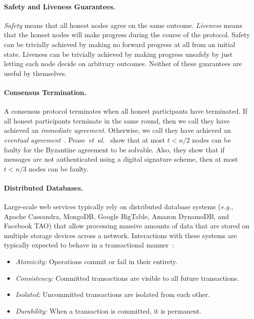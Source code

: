 \documentclass[11pt]{article}
\newcommand{\etal}{\textit{et~al.}}
\newcommand{\eg}{\textit{e.g.}}
\theoremstyle{mytheoremstyle}
\begin{document}
\paragraph{Safety and Liveness Guarantees.} \emph{Safety} means that all honest nodes agree on the same outcome. \emph{Liveness} means that the honest nodes will make progress during the course of the protocol. Safety can be trivially achieved by making no forward progress at all from an initial state. Liveness can be trivially achieved by making progress unsafely by just letting each node decide on arbitrary outcomes. Neither of these guarantees are useful by themselves.

\paragraph{Consensus Termination.} A consensus protocol terminates when all honest participants have terminated. If all honest participants terminate in the same round, then we call they have achieved an \emph{immediate agreement}. Otherwise, we call they have achieved an \emph{eventual agreement}~\cite{fischer}.
Pease~\etal~\cite{pease1980reaching} show that at most ${t<n/2}$ nodes can be faulty for the Byzantine agreement to be solvable. Also, they show that if messages are not authenticated using a digital signature scheme, then at most ${t<n/3}$ nodes can be faulty.

\paragraph{Distributed Databases.} Large-scale web services typically rely on distributed database systems (\eg, Apache Cassandra, MongoDB, Google BigTable, Amazon DynamoDB, and Facebook TAO) that allow processing massive amounts of data that are stored on multiple storage devices across a network. Interactions with these systems are typically expected to behave in a transactional manner~\cite{gilbert2002brewer}: 
\begin{itemize}
	\item \textit{Atomicity:} Operations commit or fail in their entirety.
	\item \textit{Consistency:} Committed transactions are visible to all future transactions.
	\item \textit{Isolated:} Uncommitted transactions are isolated from each other.
	\item \textit{Durability:} When a transaction is committed, it is permanent.
\end{itemize}
\end{document}
